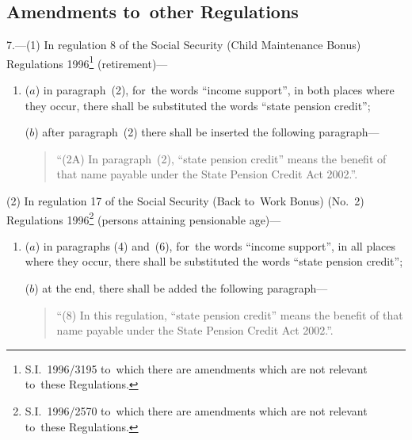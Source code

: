 \documentclass[12pt,a4paper]{article}
\begin{document}
\subsection[7. Amendments to~other Regulations]{Amendments to~other Regulations}

7.---(1)  In regulation 8 of the Social Security (Child Maintenance Bonus) Regulations 1996\footnote{S.I.~1996/3195 to~which there are amendments which are not relevant to~these Regulations.} (retirement)—
\begin{enumerate}\item[]
($a$) in paragraph~(2), for~the words “income support”, in both places where they occur, there shall be substituted the words “state pension credit”;

($b$) after paragraph~(2) there shall be inserted the following paragraph—
\begin{quotation}
“(2A) In paragraph~(2), “state pension credit” means the benefit of that name payable under the State Pension Credit Act 2002.”.
\end{quotation}
\end{enumerate}

(2) In regulation 17 of the Social Security (Back to~Work Bonus) (No.~2) Regulations 1996\footnote{S.I.~1996/2570 to~which there are amendments which are not relevant to~these Regulations.} (persons attaining pensionable age)—
\begin{enumerate}\item[]
($a$) in paragraphs (4) and~(6), for~the words “income support”, in all places where they occur, there shall be substituted the words “state pension credit”;

($b$) at the end, there shall be added the following paragraph—
\begin{quotation}
“(8) In this regulation, “state pension credit” means the benefit of that name payable under the State Pension Credit Act 2002.”.
\end{quotation}
\end{enumerate}
\end{document}
